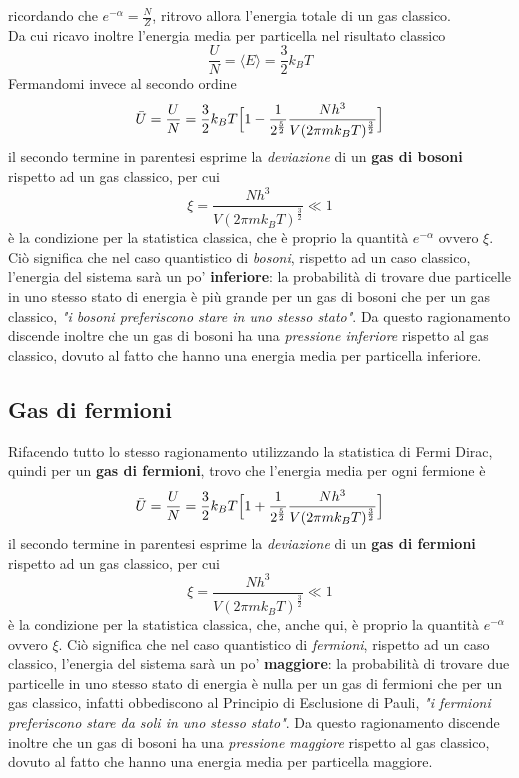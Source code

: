 ricordando che $e^{ -\alpha } = \frac{N}{Z}$, ritrovo allora l'energia totale di un gas classico. \\
Da cui ricavo inoltre l'energia media per particella nel risultato classico
\begin{equation}
\frac{U}{N} = \langle E \rangle = \frac{3}{2} k_B T
\end{equation}
Fermandomi invece al secondo ordine
\begin{equation}
\bar U = \frac{U}{N} = \frac{3}{2} k_B T \Bigl[  1 - \frac{1}{2^{ \frac{5}{2} }}  \frac{N h^3}{V (2\pi m k_B T)^{ \frac{3}{2} }}  \Bigr]
\end{equation}
il secondo termine in parentesi esprime la \textit{deviazione} di un \textbf{gas di bosoni} rispetto ad un gas classico, per cui
\begin{equation}
\xi = \frac{N h^3}{V (2\pi m k_B T)^{ \frac{3}{2} }}  \ll 1 
\end{equation}
è la condizione per la statistica classica, che è proprio la quantità $e^{-\alpha}$ ovvero $\xi$.
Ciò significa che nel caso quantistico di \textit{bosoni}, rispetto ad un caso classico, l'energia del sistema sarà un po' \textbf{inferiore}:
la probabilità di trovare due particelle in uno stesso stato di energia è più grande per un gas di bosoni che per un gas classico, \textit{"i bosoni preferiscono stare in uno stesso stato"}.
Da questo ragionamento discende inoltre che un gas di bosoni ha una \textit{pressione inferiore} rispetto al gas classico, dovuto al fatto che hanno una energia media per particella inferiore.


\subsection{Gas di fermioni} Rifacendo tutto lo stesso ragionamento utilizzando la statistica di Fermi Dirac, quindi per un \textbf{gas di fermioni}, trovo che l'energia media per ogni fermione è 
\begin{equation}
\bar U = \frac{U}{N} = \frac{3}{2} k_B T \Bigl[  1 + \frac{1}{2^{ \frac{5}{2} }} \frac{N h^3}{V (2\pi m k_B T)^{ \frac{3}{2} }} \Bigr]
\end{equation}
il secondo termine in parentesi esprime la \textit{deviazione} di un \textbf{gas di fermioni} rispetto ad un gas classico, per cui
\begin{equation}
\xi = \frac{N h^3}{V (2\pi m k_B T)^{ \frac{3}{2} }}  \ll 1 
\end{equation}
è la condizione per la statistica classica, che, anche qui, è proprio la quantità $e^{-\alpha}$ ovvero $\xi$.
Ciò significa che nel caso quantistico di \textit{fermioni}, rispetto ad un caso classico, l'energia del sistema sarà un po' \textbf{maggiore}:
la probabilità di trovare due particelle in uno stesso stato di energia è nulla per un gas di fermioni che per un gas classico, infatti obbediscono al Principio di Esclusione di Pauli, \textit{"i fermioni preferiscono stare da soli in uno stesso stato"}.
Da questo ragionamento discende inoltre che un gas di bosoni ha una \textit{pressione maggiore} rispetto al gas classico, dovuto al fatto che hanno una energia media per particella maggiore.


